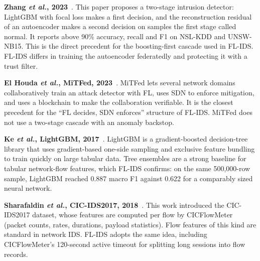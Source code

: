 \textbf{Zhang \emph{et al.}, 2023}~\cite{zhang2023lgbmae}. This paper proposes a two-stage intrusion detector: LightGBM with focal loss makes a first decision, and the reconstruction residual of an autoencoder makes a second decision on samples the first stage called normal. It reports above 90\% accuracy, recall and F1 on NSL-KDD and UNSW-NB15. This is the direct precedent for the boosting-first cascade used in FL-IDS. FL-IDS differs in training the autoencoder federatedly and protecting it with a trust filter.

\textbf{El Houda \emph{et al.}, MiTFed, 2023}~\cite{elhouda2023mitfed}. MiTFed lets several network domains collaboratively train an attack detector with FL, uses SDN to enforce mitigation, and uses a blockchain to make the collaboration verifiable. It is the closest precedent for the ``FL decides, SDN enforces'' structure of FL-IDS. MiTFed does not use a two-stage cascade with an anomaly backstop.

\textbf{Ke \emph{et al.}, LightGBM, 2017}~\cite{ke2017lightgbm}. LightGBM is a gradient-boosted decision-tree library that uses gradient-based one-side sampling and exclusive feature bundling to train quickly on large tabular data. Tree ensembles are a strong baseline for tabular network-flow features, which FL-IDS confirms: on the same 500,000-row sample, LightGBM reached 0.887 macro F1 against 0.622 for a comparably sized neural network.

\textbf{Sharafaldin \emph{et al.}, CIC-IDS2017, 2018}~\cite{sharafaldin2018cicids}. This work introduced the CIC-IDS2017 dataset, whose features are computed per flow by CICFlowMeter (packet counts, rates, durations, payload statistics). Flow features of this kind are standard in network IDS. FL-IDS adopts the same idea, including CICFlowMeter's 120-second active timeout for splitting long sessions into flow records.

